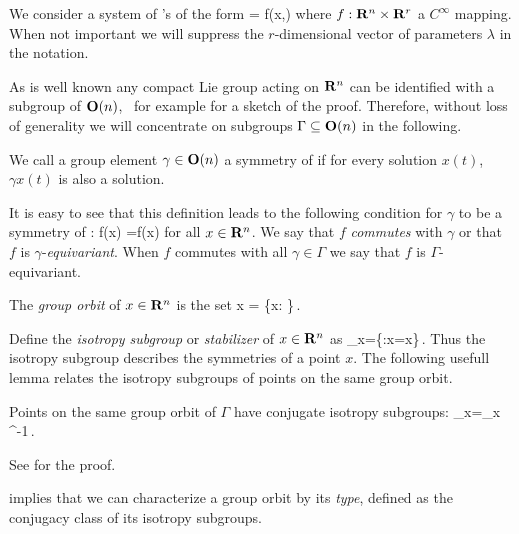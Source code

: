 
We consider a system of \ode's of the form
\beq
	 = f(x,\lambda)
	\label{eq:dynsys}
\eeq
where $f: \mathbf{R}^{n}\times\mathbf{R}^{r}$ a $C^\infty$ mapping. When
not important we will suppress the $r$-dimensional vector of parameters
$\lambda$ in the notation. 

As is well known any compact Lie group acting on $\mathbf{R}^{n}$ can be identified
with a subgroup of $\mathbf{O}(n)$, \cf\ for example  
for a sketch of the proof. Therefore, without loss of generality
we will concentrate on subgroups $\Gamma\subseteq\mathbf{O}(n)$ in the following.

\begin{definition}
We call a group element $\gamma\in\mathbf{O}(n)$ a symmetry of  if for every solution
$x(t)$, $\gamma x(t)$ is also a solution.
\end{definition}

It is easy to see that this definition leads to the following condition for $\gamma$ to
be a symmetry of :  
\beq
	f(\gamma x) =\gamma f(x)
	\label{eq:equiv}
\eeq
for all $x\in\mathbf{R}^{n}$. We say that $f$ \emph{commutes} with $\gamma$ or that $f$ is $\gamma$-\emph{equivariant}.
When $f$ commutes with all $\gamma\in\Gamma$ we say that $f$ is $\Gamma$-equivariant. 


The \emph{group orbit} of $x\in\mathbf{R}^{n}$ is the set 
\beq
	\Gamma x = \{\gamma x: \gamma\in\Gamma\}\,.
\eeq

Define the \emph{isotropy subgroup} or \emph{stabilizer} of $x\in\mathbf{R}^{n}$ as
\beq
	\Sigma_x=\{\gamma\in\Gamma:\gamma x=x\}\,.
\eeq
Thus the isotropy subgroup describes the symmetries of a point $x$. The following usefull lemma
relates the isotropy subgroups of points on the same group orbit.

\begin{lemma}
\label{lm:stabGorbit}
Points on the same group orbit of $\Gamma$ have conjugate isotropy subgroups:
\beq
	\Sigma_{\gamma x}=\gamma \Sigma_x \gamma^{-1}\,.
\eeq
\end{lemma}
See  for the proof.

 implies that we can characterize a group orbit by its \emph{type}, defined
as the conjugacy class of its isotropy subgroups. 


